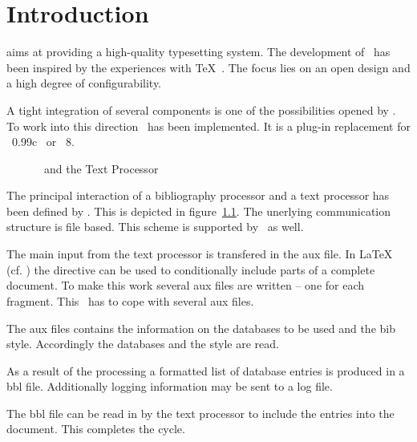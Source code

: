 
\chapter{Introduction}

\ExTeX{} aims at providing a high-quality
typesetting system. The development of \ExTeX\ has been inspired by
the experiences with \TeX\ \cite{knuth:texbook}. The focus lies on an
open design and a high degree of configurability.

A tight integration of several components is one of the possibilities
opened by \ExTeX. To work into this direction \ExBib\ has been
implemented. It is a plug-in replacement for
\BibTeX~0.99c\ \cite{btxdoc,btxhak}
or \BibTeX~8.

\begin{figure}[hb]
  \centering
  
  \caption{\ExBib\ and the Text Processor}
  \label{fig:files}
\end{figure}
The principal interaction of a bibliography processor and a text
processor has been defined by \BibTeX{}. This is
depicted in figure~\ref{fig:files}. The unerlying communication
structure is file based. This scheme is supported by \ExBib\ as well.

The main input from the text processor is transfered in the aux file.
In \LaTeX{} (cf. \cite{lamport:latex}) the directive
\verb|| can be used to conditionally include parts of a
complete document. To make this work several aux files are written --
one for each fragment. This \ExBib\ has to cope with several aux
files.

The aux files contains the information on the databases to be used
and the bib style. Accordingly the databases and the style are read.

As a result of the processing a formatted list of database entries is
produced in a bbl file. Additionally logging information may be sent
to a log file.

The bbl file can be read in by the text processor to include the
entries into the document. This completes the cycle.


